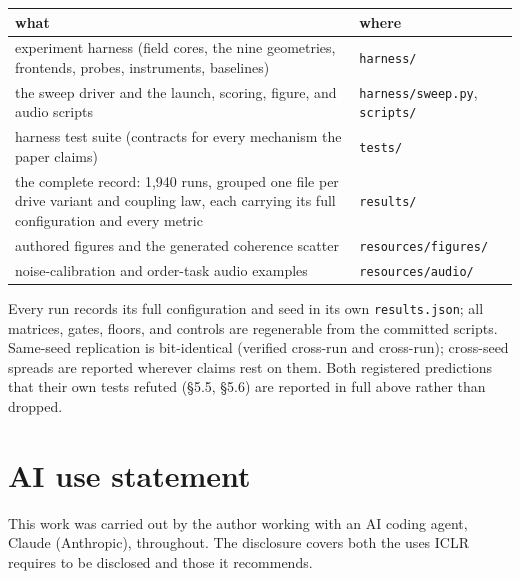 \documentclass{article}
\makeatletter
\newcounter{none} %
\newcommand{\iclr@floatbarrier}{\par\vspace{\z@}%
  \ifx\@deferlist\@empty\else\clearpage\fi}
\let\iclr@section\section
\renewcommand{\section}{\iclr@floatbarrier\iclr@section}
\makeatother
\begin{document}
{\def\LTcaptype{none} %
\begin{longtable}[]{@{}
  >{\raggedright\arraybackslash}p{}
  >{\raggedright\arraybackslash}p{}@{}}
\toprule\noalign{}
\begin{minipage}[b]{\linewidth}\raggedright
what
\end{minipage} & \begin{minipage}[b]{\linewidth}\raggedright
where
\end{minipage} \\
\midrule\noalign{}
\endhead
\bottomrule\noalign{}
\endlastfoot
experiment harness (field cores, the nine geometries, frontends, probes,
instruments, baselines) & \texttt{harness/} \\
\cmidrule{1-2}the sweep driver and the launch, scoring, figure, and
audio scripts & \texttt{harness/sweep.py}, \texttt{scripts/} \\
\cmidrule{1-2}harness test suite (contracts for every mechanism the
paper claims) & \texttt{tests/} \\
\cmidrule{1-2}the complete record: 1,940 runs, grouped one file per
drive variant and coupling law, each carrying its full configuration and
every metric & \texttt{results/} \\
\cmidrule{1-2}authored figures and the generated coherence scatter &
\texttt{resources/figures/} \\
\cmidrule{1-2}noise-calibration and order-task audio examples &
\texttt{resources/audio/} \\
\end{longtable}
}

Every run records its full configuration and seed in its own
\texttt{results.json}; all matrices, gates, floors, and controls are
regenerable from the committed scripts. Same-seed replication is
bit-identical (verified cross-run and cross-run); cross-seed spreads are
reported wherever claims rest on them. Both registered predictions that
their own tests refuted (§5.5, §5.6) are reported in full above rather
than dropped.

\section*{AI use statement}\label{ai-use-statement}

This work was carried out by the author working with an AI coding agent,
Claude (Anthropic), throughout. The disclosure covers both the uses ICLR
requires to be disclosed and those it recommends.
\end{document}

